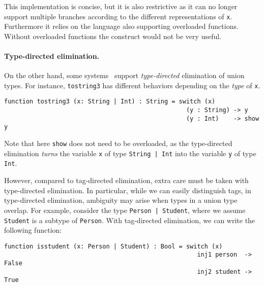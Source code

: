 \noindent This implementation is concise, but it is also restrictive as it can no longer
support multiple branches according to the different representations of
\lstinline{x}. Furthermore it relies on the language also supporting overloaded
functions. Without overloaded functions the construct would not be very useful.

\paragraph{Type-directed elimination.}

On the other hand, some
systems~\cite{castagna:settheoretic} support
\textit{type-directed} elimination of union types. For instance,
\lstinline{tostring3} has different behaviors depending on the \textit{type} of
\lstinline{x}.

\begin{lstlisting}
function tostring3 (x: String | Int) : String = switch (x)
                                                  (y : String) -> y
                                                  (y : Int)    -> show y
\end{lstlisting}

\noindent Note that here \lstinline{show} does not need to be overloaded,
as the type-directed elimination
\textit{turns} the variable \lstinline{x} of type \lstinline{String | Int} into
the variable \lstinline{y} of type \lstinline{Int}.

However, compared to tag-directed elimination, extra care must be taken with
type-directed elimination. In particular, while we can easily distinguish tags,
in type-directed elimination, ambiguity may arise when types in a union type
overlap. For example, consider the type \lstinline{Person | Student}, where we
assume \lstinline{Student} is a subtype of \lstinline{Person}. With tag-directed
elimination, we can write the following function:

\begin{lstlisting}
function isstudent (x: Person | Student) : Bool = switch (x)
                                                     inj1 person  -> False
                                                     inj2 student -> True
\end{lstlisting}

